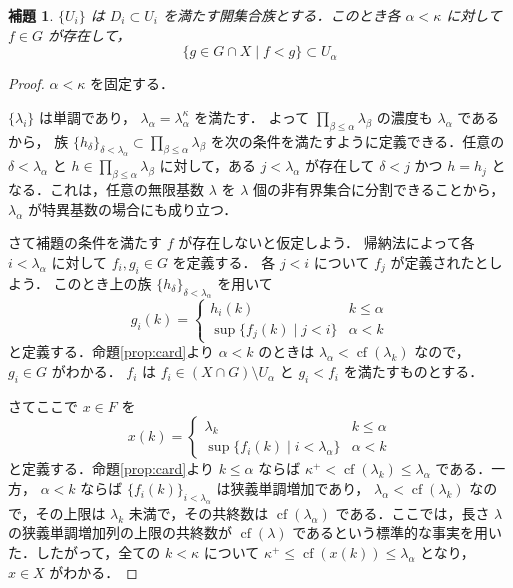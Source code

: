 \documentclass[leqno, 12pt]{ltjsarticle}
\newtheorem{lem}[thm]{補題}
\newcommand{\kappasucc}{\kappa^{+}}
\DeclareMathOperator{\cf}{cf}
\begin{document}
\begin{lem}\label{lem:kinouhou}
$\{U_{i}\}$
は
$D_{i}\subset U_{i}$
を満たす開集合族とする．このとき各
$\alpha<\kappa$
に対して
$f\in G$
が存在して，
\[
\{g\in G\cap X \mid f<g\}\subset U_{\alpha}
\]
\end{lem}
\begin{proof}
 $\alpha<\kappa$
 を固定する．

$\{\lambda_{i}\}$
は単調であり，
$\lambda_{\alpha}=\lambda_{\alpha}^{\kappa}$
を満たす．
よって
$\prod_{\beta\le \alpha}\lambda_{\beta}$
の濃度も
$\lambda_{\alpha}$
であるから，
族
$\{h_{\delta}\}_{\delta<\lambda_{\alpha}}\subset \prod_{\beta\le \alpha}\lambda_{\beta}$
を次の条件を満たすように定義できる．任意の
$\delta<\lambda_{\alpha}$
と
$h\in\prod_{\beta\le\alpha}\lambda_{\beta}$
に対して，ある
$j<\lambda_{\alpha}$
が存在して
$\delta<j$
かつ
$h=h_{j}$
となる．これは，任意の無限基数
$\lambda$
を
$\lambda$
個の非有界集合に分割できることから，
$\lambda_{\alpha}$
が特異基数の場合にも成り立つ．



さて補題の条件を満たす
$f$
が存在しないと仮定しよう．
帰納法によって各
$i<\lambda_{\alpha}$
に対して
$f_{i}, g_{i}\in G$
を定義する．
各
$j<i$
について
$f_{j}$
が定義されたとしよう．
このとき上の族
$\{h_{\delta}\}_{\delta<\lambda_{\alpha}}$
を用いて
\[
g_{i}(k)=
	\begin{cases}
	h_{i}(k) & \text{$k\le \alpha$}\\
	\sup\{f_{j}(k) \mid j<i\} & \text{$\alpha<k$}
	\end{cases}
\]
と定義する．命題\ref{prop:card}より
$\alpha<k$
のときは
$\lambda_{\alpha}<\cf(\lambda_{k})$
なので，
$g_{i}\in G$
がわかる．
$f_{i}$
は
$f_{i}\in (X\cap G)\setminus U_{\alpha}$
と
$g_{i}<f_{i}$
を満たすものとする．

さてここで
$x\in F$
を
\[
x(k)=
	\begin{cases}
	\lambda_{k} & \text{$k\le \alpha$}\\
		\sup\{f_{i}(k) \mid i<\lambda_{\alpha}\} &\text{$\alpha<k$}
	\end{cases}
\]
と定義する．命題\ref{prop:card}より
$k\le\alpha$
ならば
$\kappasucc<\cf(\lambda_{k})\le\lambda_{\alpha}$
である．一方，
$\alpha<k$
ならば
$\{f_{i}(k)\}_{i<\lambda_{\alpha}}$
は狭義単調増加であり，
$\lambda_{\alpha}<\cf(\lambda_{k})$
なので，その上限は
$\lambda_{k}$
未満で，その共終数は
$\cf(\lambda_{\alpha})$
である．ここでは，長さ
$\lambda$
の狭義単調増加列の上限の共終数が
$\cf(\lambda)$
であるという標準的な事実を用いた．したがって，全ての
$k<\kappa$
について
$\kappasucc\le\cf(x(k))\le\lambda_{\alpha}$
となり，
$x\in X$
がわかる．


\end{proof}
\end{document}
